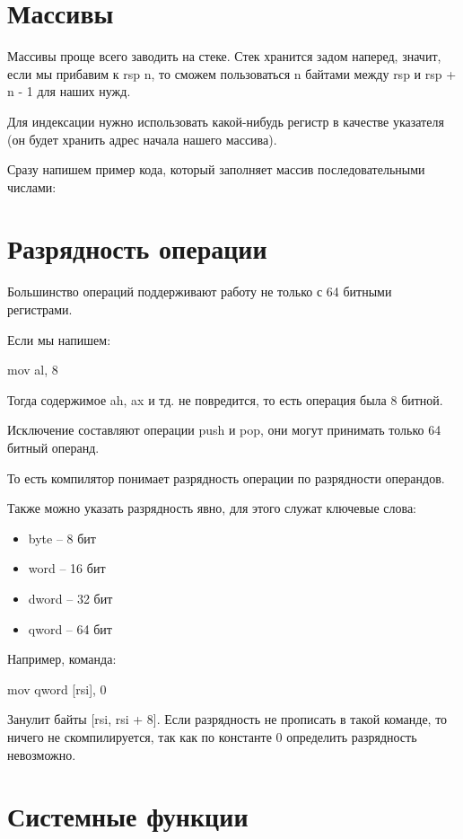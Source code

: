 \documentclass[a4paper,12pt]{article}
\begin{document}


\section{Массивы}

Массивы проще всего заводить на стеке. Стек хранится задом наперед,
значит, если мы прибавим к rsp n, то сможем пользоваться n байтами
между rsp и rsp + n - 1 для наших нужд.

Для индексации нужно использовать какой-нибудь регистр в качестве
указателя (он будет хранить адрес начала нашего массива).

Сразу напишем пример кода, который заполняет массив последовательными
числами:



\section{Разрядность операции}

Большинство операций поддерживают работу не только с 64 битными
регистрами.

Если мы напишем:

mov al, 8

Тогда содержимое ah, ax и тд. не повредится, то есть операция была 8
битной.

Исключение составляют операции push и pop, они могут принимать только
64 битный операнд.

То есть компилятор понимает разрядность операции по разрядности
операндов.

Также можно указать разрядность явно, для этого служат ключевые слова:

\begin{itemize}
  \item byte -- 8 бит
  \item word -- 16 бит
  \item dword -- 32 бит
  \item qword -- 64 бит
\end{itemize}

Например, команда:

mov qword [rsi], 0
 
Занулит байты [rsi, rsi + 8]. Если разрядность не прописать в такой
команде, то ничего не скомпилируется, так как по константе 0
определить разрядность невозможно.

\section{Системные функции}
\end{document}
